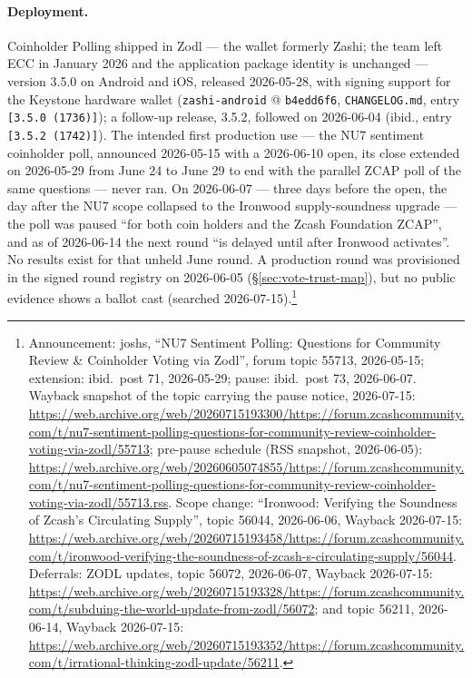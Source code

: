 \documentclass[11pt,a4paper]{article}
\theoremstyle{definition}
\begin{document}
\paragraph{Deployment.} Coinholder Polling shipped in Zodl --- the wallet
formerly Zashi; the team left ECC in January 2026 and the application package
identity is unchanged --- version 3.5.0 on Android and iOS, released
2026-05-28, with signing support for the Keystone hardware wallet
(\texttt{zashi-android} @ \texttt{b4edd6f6}, \texttt{CHANGELOG.md}, entry
\texttt{[3.5.0 (1736)]}); a follow-up release, 3.5.2, followed on 2026-06-04
(ibid., entry \texttt{[3.5.2 (1742)]}). The intended first production use
--- the NU7 sentiment coinholder poll, announced 2026-05-15 with a
2026-06-10 open, its close extended on 2026-05-29 from June 24 to June 29
to end with the parallel ZCAP poll of the same questions --- never ran. On
2026-06-07 --- three days before the open, the day after the NU7 scope
collapsed to the Ironwood supply-soundness upgrade --- the poll was paused
``for both coin holders and the Zcash Foundation ZCAP'', and as of
2026-06-14 the next round ``is delayed until after Ironwood activates''.
No results exist for that unheld June round. A production round was
provisioned in the signed round
registry on 2026-06-05 (\S\ref{sec:vote-trust-map}), but no public
evidence shows a ballot cast (searched 2026-07-15).\footnote{Announcement:
joshs, ``NU7 Sentiment Polling: Questions for Community Review \&
Coinholder Voting via Zodl'', forum topic 55713, 2026-05-15; extension:
ibid.\ post 71, 2026-05-29; pause: ibid.\ post 73, 2026-06-07. Wayback
snapshot of the topic carrying the pause notice, 2026-07-15:
\url{https://web.archive.org/web/20260715193300/https://forum.zcashcommunity.com/t/nu7-sentiment-polling-questions-for-community-review-coinholder-voting-via-zodl/55713};
pre-pause schedule (RSS snapshot, 2026-06-05):
\url{https://web.archive.org/web/20260605074855/https://forum.zcashcommunity.com/t/nu7-sentiment-polling-questions-for-community-review-coinholder-voting-via-zodl/55713.rss}.
Scope change: ``Ironwood: Verifying the Soundness of Zcash's Circulating
Supply'', topic 56044, 2026-06-06, Wayback 2026-07-15:
\url{https://web.archive.org/web/20260715193458/https://forum.zcashcommunity.com/t/ironwood-verifying-the-soundness-of-zcash-s-circulating-supply/56044}.
Deferrals: ZODL updates, topic 56072, 2026-06-07, Wayback 2026-07-15:
\url{https://web.archive.org/web/20260715193328/https://forum.zcashcommunity.com/t/subduing-the-world-update-from-zodl/56072};
and topic 56211, 2026-06-14, Wayback 2026-07-15:
\url{https://web.archive.org/web/20260715193352/https://forum.zcashcommunity.com/t/irrational-thinking-zodl-update/56211}.}
\end{document}
